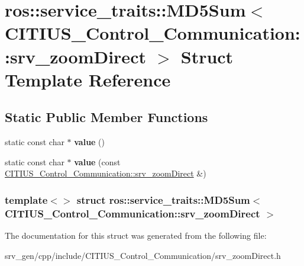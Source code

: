 \hypertarget{structros_1_1service__traits_1_1_m_d5_sum_3_01_c_i_t_i_u_s___control___communication_1_1srv__zoom_direct_01_4}{\section{ros\-:\-:service\-\_\-traits\-:\-:\-M\-D5\-Sum$<$ \-C\-I\-T\-I\-U\-S\-\_\-\-Control\-\_\-\-Communication\-:\-:srv\-\_\-zoom\-Direct $>$ \-Struct \-Template \-Reference}
\label{structros_1_1service__traits_1_1_m_d5_sum_3_01_c_i_t_i_u_s___control___communication_1_1srv__zoom_direct_01_4}
}
\subsection*{\-Static \-Public \-Member \-Functions}
\begin{DoxyCompactItemize}
\item 
\hypertarget{structros_1_1service__traits_1_1_m_d5_sum_3_01_c_i_t_i_u_s___control___communication_1_1srv__zoom_direct_01_4_a9d4b775f03d05af2f47d9d22b9d9edd8}{static const char $\ast$ {\bfseries value} ()}\label{structros_1_1service__traits_1_1_m_d5_sum_3_01_c_i_t_i_u_s___control___communication_1_1srv__zoom_direct_01_4_a9d4b775f03d05af2f47d9d22b9d9edd8}

\item 
\hypertarget{structros_1_1service__traits_1_1_m_d5_sum_3_01_c_i_t_i_u_s___control___communication_1_1srv__zoom_direct_01_4_a3b9d0eed544e8596c4da500228e56236}{static const char $\ast$ {\bfseries value} (const \hyperlink{struct_c_i_t_i_u_s___control___communication_1_1srv__zoom_direct}{\-C\-I\-T\-I\-U\-S\-\_\-\-Control\-\_\-\-Communication\-::srv\-\_\-zoom\-Direct} \&)}\label{structros_1_1service__traits_1_1_m_d5_sum_3_01_c_i_t_i_u_s___control___communication_1_1srv__zoom_direct_01_4_a3b9d0eed544e8596c4da500228e56236}

\end{DoxyCompactItemize}
\subsubsection*{template$<$$>$ struct ros\-::service\-\_\-traits\-::\-M\-D5\-Sum$<$ C\-I\-T\-I\-U\-S\-\_\-\-Control\-\_\-\-Communication\-::srv\-\_\-zoom\-Direct $>$}



\-The documentation for this struct was generated from the following file\-:\begin{DoxyCompactItemize}
\item 
srv\-\_\-gen/cpp/include/\-C\-I\-T\-I\-U\-S\-\_\-\-Control\-\_\-\-Communication/srv\-\_\-zoom\-Direct.\-h\end{DoxyCompactItemize}
